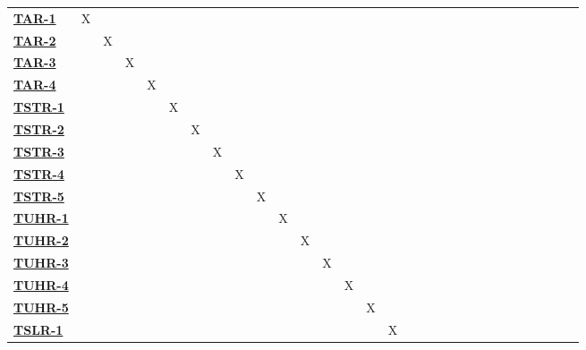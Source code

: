 \documentclass[12pt, titlepage]{article}
\begin{document}
\begin{landscape}
\begin{table}
\begin{adjustbox}{width=1.2\textwidth}
\begin{tabular}{l|ccccccccccccccccccccccccc}
        \hyperref[TAR-1]{\textbf{TAR-1}}  & X & ~ & ~ & ~ & ~ & ~ & ~ & ~ & ~ & ~ & ~ & ~ & ~ & ~ & ~ & ~ & ~ & ~ & ~ & ~ & ~ & ~ & ~\\
        \hyperref[TAR-2]{\textbf{TAR-2}}    & ~ & X & ~ & ~ & ~ & ~ & ~ & ~ & ~ & ~ & ~ & ~ & ~ & ~ & ~ & ~ & ~ & ~ & ~ & ~ & ~ & ~ & ~\\
        \hyperref[TAR-3]{\textbf{TAR-3}}  & ~ & ~ & X & ~ & ~ & ~ & ~ & ~ & ~ & ~ & ~ & ~ & ~ & ~ & ~ & ~ & ~ & ~ & ~ & ~ & ~ & ~ & ~\\
        \hyperref[TAR-4]{\textbf{TAR-4}}  & ~ & ~ & ~ & X & ~ & ~ & ~ & ~ & ~ & ~ & ~ & ~ & ~ & ~ & ~ & ~ & ~ & ~ & ~ & ~ & ~ & ~ & ~\\
        \hyperref[TSTR-1]{\textbf{TSTR-1}}  & ~ & ~ & ~ & ~ & X & ~ & ~ & ~ & ~ & ~ & ~ & ~ & ~ & ~ & ~ & ~ & ~ & ~ & ~ & ~ & ~ & ~ & ~\\
        \hyperref[TSTR-2]{\textbf{TSTR-2}}  & ~ & ~ & ~ & ~ & ~ & X & ~ & ~ & ~ & ~ & ~ & ~ & ~ & ~ & ~ & ~ & ~ & ~ & ~ & ~ & ~ & ~ & ~\\
        \hyperref[TSTR-3]{\textbf{TSTR-3}}  & ~ & ~ & ~ & ~ & ~ & ~ & X & ~ & ~ & ~ & ~ & ~ & ~ & ~ & ~ & ~ & ~ & ~ & ~ & ~ & ~ & ~ & ~\\
        \hyperref[TSTR-4]{\textbf{TSTR-4}}  & ~ & ~ & ~ & ~ & ~ & ~ & ~ & X & ~ & ~ & ~ & ~ & ~ & ~ & ~ & ~ & ~ & ~ & ~ & ~ & ~ & ~ & ~\\
        \hyperref[TSTR-5]{\textbf{TSTR-5}}  & ~ & ~ & ~ & ~ & ~ & ~ & ~ & ~ & X & ~ & ~ & ~ & ~ & ~ & ~ & ~ & ~ & ~ & ~ & ~ & ~ & ~ & ~\\
        \hyperref[TUHR-1]{\textbf{TUHR-1}}  & ~ & ~ & ~ & ~ & ~ & ~ & ~ & ~ & ~ & X & ~ & ~ & ~ & ~ & ~ & ~ & ~ & ~ & ~ & ~ & ~ & ~ & ~\\
        \hyperref[TUHR-2]{\textbf{TUHR-2}}    & ~ & ~ & ~ & ~ & ~ & ~ & ~ & ~ & ~ & ~ & X & ~ & ~ & ~ & ~ & ~ & ~ & ~ & ~ & ~ & ~ & ~ & ~\\
        \hyperref[TUHR-3]{\textbf{TUHR-3}}  & ~ & ~ & ~ & ~ & ~ & ~ & ~ & ~ & ~ & ~ & ~ & X & ~ & ~ & ~ & ~ & ~ & ~ & ~ & ~ & ~ & ~ & ~\\
        \hyperref[TUHR-4]{\textbf{TUHR-4}}  & ~ & ~ & ~ & ~ & ~ & ~ & ~ & ~ & ~ & ~ & ~ & ~ & X & ~ & ~ & ~ & ~ & ~ & ~ & ~ & ~ & ~ & ~\\
        \hyperref[TUHR-5]{\textbf{TUHR-5}}  & ~ & ~ & ~ & ~ & ~ & ~ & ~ & ~ & ~ & ~ & ~ & ~ & ~ & X & ~ & ~ & ~ & ~ & ~ & ~ & ~ & ~ & ~\\
        \hyperref[TSLR-1]{\textbf{TSLR-1}}  & ~ & ~ & ~ & ~ & ~ & ~ & ~ & ~ & ~ & ~ & ~ & ~ & ~ & ~ & X & ~ & ~ & ~ & ~ & ~ & ~ & ~ & ~\\

\end{tabular}
\end{adjustbox}
\end{table}
\end{landscape}
\end{document}
